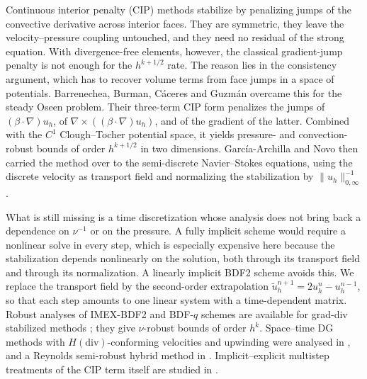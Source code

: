 \documentclass[11pt]{article}
\theoremstyle{remark}\newtheorem{remark}{Remark}
\newcommand{\tu}{\tilde u_h}
\theoremstyle{plain}
\begin{document}
{Continuous interior penalty (CIP) methods \cite{BH04,BFH06,BF07} stabilize by penalizing jumps of the convective derivative across interior faces. They are symmetric, they leave the velocity--pressure coupling untouched, and they need no residual of the strong equation. With divergence-free elements, however, the classical gradient-jump penalty is not enough for the $h^{k+1/2}$ rate. The reason lies in the consistency argument, which has to recover volume terms from face jumps in a space of potentials. Barrenechea, Burman, C\'aceres and Guzm\'an \cite{BBCG24} overcame this for the steady Oseen problem. Their three-term CIP form penalizes the jumps of $(\beta\cdot\nabla)u_h$, of $\nabla\times((\beta\cdot\nabla)u_h)$, and of the gradient of the latter. Combined with the $C^1$ Clough--Tocher potential space, it yields pressure- and convection-robust bounds of order $h^{k+1/2}$ in two dimensions. Garc\'ia-Archilla and Novo \cite{GAN25} then carried the method over to the semi-discrete Navier--Stokes equations, using the discrete velocity as transport field and normalizing the stabilization by $\|u_h\|_{0,\infty}^{-1}$.

What is still missing is a time discretization whose analysis does not bring back a dependence on $\nu^{-1}$ or on the pressure. A fully implicit scheme would require a nonlinear solve in every step, which is especially expensive here because the stabilization depends nonlinearly on the solution, both through its transport field and through its normalization. A linearly implicit BDF2 scheme avoids this. We replace the transport field by the second-order extrapolation $\tu^{n+1}=2u_h^n-u_h^{n-1}$, so that each step amounts to one linear system with a time-dependent matrix. Robust analyses of IMEX-BDF2 and BDF-$q$ schemes are available for grad-div stabilized methods \cite{GAN23,GAJN25}; they give $\nu$-robust bounds of order $h^k$. Space--time DG methods with $H(\mathrm{div})$-conforming velocities and upwinding were analysed in \cite{BDDG25}, and a Reynolds semi-robust hybrid method in \cite{BDDHR25}. Implicit--explicit multistep treatments of the CIP term itself are studied in \cite{BG20}.

}
\end{document}
